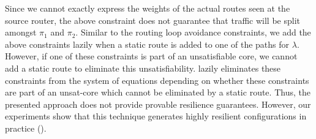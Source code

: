 Since we cannot exactly express the weights of the actual routes seen 
at the source router, the above constraint does not  guarantee 
that traffic will be split amongst
$\pi_1$ and $\pi_2$. 
Similar to the routing loop avoidance constraints, we add the
above constraints lazily when a static route is added to one of the
paths for $\lambda$. However, if one of these constraints is part of 
an unsatisfiable core, we cannot add a static route to eliminate 
this unsatisfiability. \name lazily eliminates these constraints from the
system of equations depending on whether these constraints are part of 
an unsat-core which cannot be eliminated by a static route. 
Thus, the presented approach does not provide provable 
resilience guarantees.
However, our experiments show that
this technique generates highly resilient configurations 
in practice (). 

